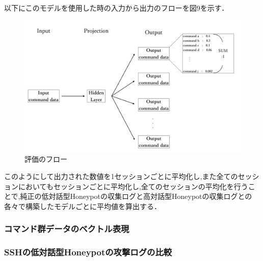 以下にこのモデルを使用した時の入力から出力のフローを図9を示す．

\begin{figure}[H]
    \centering
    \includegraphics[width=1.0\textwidth]{figures/evalflow.png}
    \caption{評価のフロー\cite{word2vecpaper}\cite{word2vecpaper2}}
    \label{fig:evo}
\end{figure}

このようにして出力された数値を1セッションごとに平均化し,また全てのセッションにおいてもセッションごとに平均化し,全てのセッションの平均化を行うことで,純正の低対話型Honeypotの収集ログと高対話型Honeypotの収集ログとの各々で構築したモデルごとに平均値を算出する．


\subsubsection{コマンド群データのベクトル表現}
\label{eval:CommandVector}

\subsubsection{SSHの低対話型Honeypotの攻撃ログの比較}
\label{eval:CompareLog}



